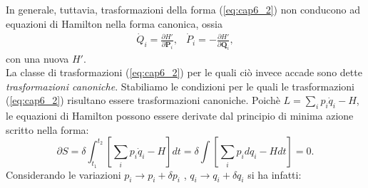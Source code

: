 In generale, tuttavia, trasformazioni della forma (\ref{eq:cap6_2}) non conducono ad equazioni di Hamilton nella forma canonica, ossia
\begin{equation}
\begin{matrix}
\dot{Q}_i = \frac{\partial H'}{\partial \mathbf{P}_i}, & \dot{P}_i = -\frac{\partial H'}{\partial \mathbf{Q}_i}  ,
\end{matrix}
\end{equation}
con una nuova $H'$.\\
La classe di trasformazioni (\ref{eq:cap6_2}) per le quali ci\`o invece accade sono dette \textit{trasformazioni canoniche}. Stabiliamo le condizioni per le quali le trasformazioni (\ref{eq:cap6_2}) risultano essere trasformazioni canoniche.
Poich\`e $ L = \sum _i p_i \dot{q}_i -H $, le equazioni di Hamilton possono essere derivate dal principio di minima azione scritto nella forma:
\begin{equation}
\partial S = \delta \int_{t_1}^{t_2} \left[ \sum_i p_i \dot{q}_i - H \right] dt = \delta \int \left[ \sum_i p_i dq_i - Hdt \right] = 0 .
\label{eq:cap6_3}
\end{equation}
Considerando le variazioni $p_i \rightarrow p_i + \delta p_i$ , $q_i \rightarrow q_i + \delta q_i$ si ha infatti:


